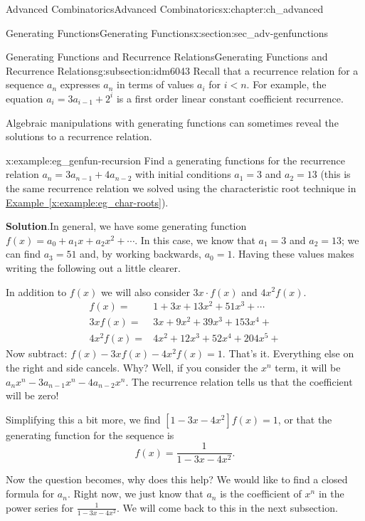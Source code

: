 \documentclass[oneside,10pt,]{book}
\numberwithin{equation}{chapter}
\newcommand{\lt}{<}
\newcommand{\amp}{&}
\begin{document}
\begin{chapterptx}{Advanced Combinatorics}{}{Advanced Combinatorics}{}{}{x:chapter:ch_advanced}
\begin{sectionptx}{Generating Functions}{}{Generating Functions}{}{}{x:section:sec_adv-genfunctions}
\begin{subsectionptx}{Generating Functions and Recurrence Relations}{}{Generating Functions and Recurrence Relations}{}{}{g:subsection:idm6043}
Recall that a recurrence relation for a sequence \(a_n\) expresses \(a_n\) in terms of values \(a_i\) for \(i\lt n\). For example, the equation \(a_i=3a_{i-1} +2^i\) is a first order linear constant coefficient recurrence.%
\par
Algebraic manipulations with generating functions can sometimes reveal the solutions to a recurrence relation.%
\begin{example}{}{x:example:eg_genfun-recursion}%
Find a generating functions for the recurrence relation \(a_n = 3a_{n-1} + 4a_{n-2}\) with initial conditions \(a_1 = 3\) and \(a_2 = 13\) (this is the same recurrence relation we solved using the characteristic root technique in \hyperref[x:example:eg_char-roots]{Example~\ref{x:example:eg_char-roots}}).%
\par\smallskip%
\noindent\textbf{Solution}.\hypertarget{g:solution:idm6059}{}\quad{}In general, we have some generating function \(f(x) = a_0 + a_1x + a_2x^2 + \cdots\).  In this case, we know that \(a_1 = 3\) and \(a_2 = 13\); we can find \(a_3 = 51\) and, by working backwards, \(a_0 = 1\).  Having these values makes writing the following out a little clearer.%
\par
In addition to \(f(x)\) we will also consider \(3x\cdot f(x)\) and \(4x^2 f(x)\).%
\begin{align*}
f(x) = \amp 1 + 3x + 13x^2 + 51 x^3 + \cdots \\
3x f(x) = \amp 3x + 9x^2 + 39x^3 + 153 x^4 +  \\
4x^2 f(x) = \amp 4x^2 + 12x^3 + 52x^4 + 204 x^5 +  
\end{align*}
Now subtract: \(f(x) - 3xf(x) - 4x^2f(x) = 1\).  That's it.  Everything else on the right and side cancels.  Why?  Well, if you consider the \(x^n\) term, it will be \(a_n x^n - 3a_{n-1}x^n - 4a_{n-2}x^n\).  The recurrence relation tells us that the coefficient will be zero!%
\par
Simplifying this a bit more, we find \([1- 3x - 4x^2]f(x) = 1\), or that the generating function for the sequence is%
\begin{equation*}
f(x) = \frac{1}{1-3x-4x^2}\text{.}
\end{equation*}
%
\par
Now the question becomes, why does this help?  We would like to find a closed formula for \(a_n\).  Right now, we just know that \(a_n\) is the coefficient of \(x^n\) in the power series for \(\frac{1}{1-3x-4x^2}\).  We will come back to this in the next subsection.%
\end{example}

\end{subsectionptx}
\end{sectionptx}
\end{chapterptx}
\end{document}
